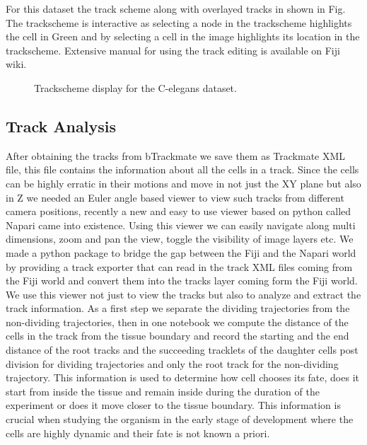 \documentclass[letterpaper,compsoc,twoside]{IEEEtran}
\begin{document}
For this dataset the track scheme along with overlayed tracks in shown in Fig. The trackscheme is interactive as selecting a node in the trackscheme highlights the cell in Green and by selecting a cell in the image highlights its location in the trackscheme. Extensive manual for using the track editing is available on Fiji wiki.\begin{figure}[]
\label{fig-trackscheme}\noindent{}
\caption{Trackscheme display for the C-elegans dataset.}
\end{figure}

\subsection{Track Analysis%
  \label{track-analysis}%
}


After obtaining the tracks from bTrackmate we save them as Trackmate XML file, this file contains the information about all the cells in a track. Since the cells can be highly erratic in their motions and move in not just the XY plane but also in Z we needed an Euler angle based viewer to view such tracks from different camera positions, recently a new and easy to use viewer based on python called Napari came into existence. Using this viewer we can easily navigate along multi dimensions, zoom and pan the view, toggle the visibility of image layers etc. We made a python package to bridge the gap between the Fiji and the Napari world by providing a track exporter that can read in the track XML files coming from the Fiji world and convert them into the tracks layer coming form the Fiji world. We use this viewer not just to view the tracks but also to analyze and extract the track information. As a first step we separate the dividing trajectories from the non-dividing trajectories, then in one notebook we compute the distance of the cells in the track from the tissue boundary and record the starting and the end distance of the root tracks and the succeeding tracklets of the daughter cells post division for dividing trajectories and only the root track for the non-dividing trajectory. This information is used to determine how cell chooses its fate, does it start from inside the tissue and remain inside during the duration of the experiment or does it move closer to the tissue boundary. This information is crucial when studying the organism in the early stage of development where the cells are highly dynamic and their fate is not known a priori.
\end{document}
